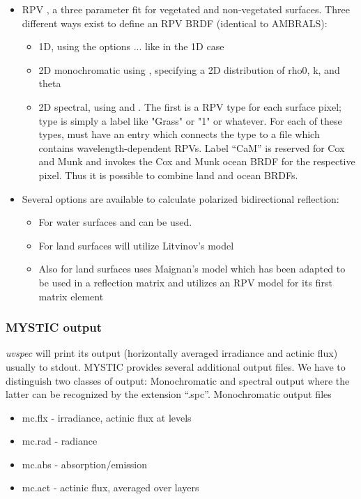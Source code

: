 {\begin{itemize}
\item RPV \citep{rahman93a}, a three parameter 
  fit for vegetated and non-vegetated surfaces. 
  Three different ways exist to define an RPV BRDF (identical to AMBRALS):
  \begin{itemize}
  \item 1D, using the options  ... like in the 1D case
  \item 2D monochromatic using , specifying a
    2D distribution of rho0, k, and theta
  \item 2D spectral, using  and .
    The first is a RPV
    type for each surface pixel; type is simply a label like 
    "Grass" or "1" or whatever. For each of these types,
     must have an entry which connects the type to
    a file which contains wavelength-dependent RPVs. Label ``CaM'' is reserved for Cox and Munk 
    and invokes the Cox and Munk ocean BRDF for the respective pixel. Thus
    it is possible to combine land and ocean BRDFs.
  \end{itemize}
  \item Several options are available to calculate polarized bidirectional reflection:
  \begin{itemize}
    \item For water surfaces  and  can be used.
    \item For land surfaces  will utilize Litvinov's model
    \item Also for land surfaces  uses Maignan's model which has been adapted to be used in a reflection matrix and utilizes an RPV model for its first matrix element
  \end{itemize}
\end{itemize}
}

\subsubsection{MYSTIC output}

{\sl uvspec} will print its output (horizontally averaged 
irradiance and actinic flux) usually to stdout. MYSTIC provides 
several additional output 
files. We have to distinguish two classes of output: 
Monochromatic and spectral output where the latter can be recognized 
by the extension ``.spc''. Monochromatic output files

\begin{itemize}
\item mc.flx - irradiance, actinic flux at levels
\item mc.rad - radiance 
\item mc.abs - absorption/emission
\item mc.act - actinic flux, averaged over layers
\end{itemize}  

